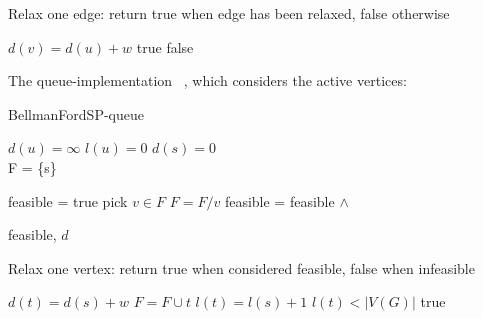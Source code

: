 \documentclass[]{article}
\begin{document}
\begin{algorithm}
  \caption{Relax one edge: return true when edge has been relaxed, false otherwise}
\begin{algorithmic}[H]
        \State $d(v) = d(u) + w$
        \State \Return true
    \EndIf
    \State \Return false
    
    \EndFunction
\end{algorithmic}
\end{algorithm}


The queue-implementation~\cite{books/daglib/0029345} \cite{BellmanFordOnGPUKepler}, which considers the active vertices:

\begin{algorithm}
    \caption{BellmanFordSP-queue}    
    \begin{algorithmic}[H]
        \State $d(u) = \infty$
        \State $l(u) = 0$
        \EndFor
        \State $d(s) = 0$\\
        \State {}
        \State F = \{s\}
        
        \State feasible = true
            \State pick $v \in F$
            \State $F = F / v$
            \State feasible = feasible $\wedge$ 
        \EndWhile

        \State \Return feasible, $d$
        \EndFunction
    \end{algorithmic}
\end{algorithm}

\begin{algorithm}
    \caption{Relax one vertex: return true when considered feasible, false when infeasible}
    \begin{algorithmic}[H]
        \State $d(t) = d(s) + w$
        \State $F = F \cup {t}$ 
        \State $l(t) = l(s) + 1$ 
        \State {}
        \State \Return $l(t) < |V(G)|$ 
        \EndIf
        \Return true 
        \EndFor
        
        \EndFunction
    \end{algorithmic}
\end{algorithm}
\end{document}
